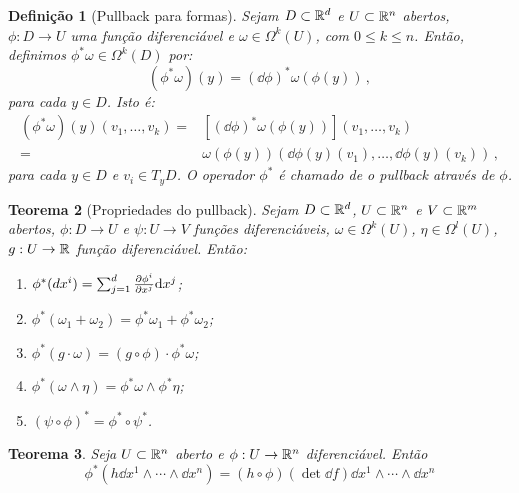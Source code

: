\documentclass[a4paper,12pt]{extreport}
\newtheorem{mydef}{Definição}
\newtheorem{myteo}[mydef]{Teorema}
\newif\ifspacesbetweentheos
\newcommand{\theospace}[1]{
\ifspacesbetweentheos
  \vspace{#1}
\fi
}
\begin{document}
\begin{mydef}[Pullback para formas]
  Sejam $D \subset \mathbb{R}^d$ e $U \subset \mathbb{R}^n$ abertos,
  $\phi:D \to U$ uma função diferenciável
  e $\omega \in \Omega^k(U)$, com $0 \le k \le n$.
  Então, definimos $\phi^* \omega \in \Omega^k(D)$ por:
  \begin{equation}
    (\phi^* \omega)(y) = (\dd{\phi})^*\omega(\phi(y))\,,
  \end{equation}
  para cada $y \in D$. Isto é:
  \begin{equation}
    \begin{split}
      (\phi^* \omega)(y)(v_1,\dots, v_k)
      =&
         [(\dd{\phi})^* \omega(\phi(y))] (v_1,\dots, v_k)\\
      =&
         \omega(\phi(y))  (\dd{\phi}(y)(v_1),\dots, \dd{\phi}(y)(v_k))\,,
    \end{split}
  \end{equation}
  para cada $y \in D$ e $v_i \in T_yD$.
  O operador $\phi^*$ é chamado de o \emph{pullback através de $\phi$}.
\end{mydef}


\theospace{3cm}


\begin{myteo}[Propriedades do pullback]
  Sejam $D \subset \mathbb{R}^d$, $U \subset \mathbb{R}^n$
  e $V \subset \mathbb{R}^m$ abertos,
  $\phi:D \to U$ e $\psi:U \to V$ funções diferenciáveis,
  $\omega \in \Omega^k(U)$,
  $\eta \in \Omega^l(U)$,
  $g: U \to \mathbb{R}$ função diferenciável.
  Então:
  \begin{enumerate}[label=\alph*)]
  \item $\phi^*(dx^i) = \sum_{j=1}^d\pdv{\phi^i}{x^j} \dd x^j$;
  \item $\phi^*(\omega_1 + \omega_2) = \phi^*\omega_1 + \phi^*\omega_2$;
  \item $\phi^*(g \cdot \omega) = (g \circ \phi) \cdot \phi^*\omega$;
  \item $\phi^*(\omega \wedge \eta) = \phi^*\omega \wedge \phi^* \eta$;
  \item $(\psi \circ \phi)^* = \phi^* \circ \psi^*$.
  \end{enumerate}
\end{myteo}


\theospace{3cm}


\begin{myteo}
  Seja $U \subset \mathbb{R}^n$ aberto e $\phi:U \to \mathbb{R}^n$ diferenciável.
  Então
  \begin{equation}
    \phi^*(h \dd{x^1} \wedge \cdots \wedge \dd{x^n})
    = (h \circ \phi) (\det \dd{f}) \dd{x^1} \wedge \cdots \wedge \dd{x^n}
  \end{equation}
  
\end{myteo}
\end{document}
